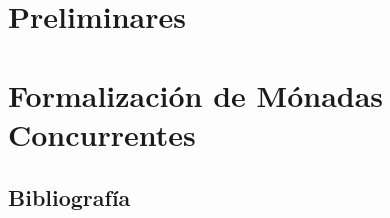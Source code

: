 \documentclass[a4paper,spanish,fixlanguage]{book}
\begin{document}




\frontmatter

\setcounter{tocdepth}{1}
\tableofcontents

\mainmatter



\part{Preliminares}\label{part:pre}





\part{Formalización de Mónadas Concurrentes}\label{part:mc}

 




\begin{appendices}

\end{appendices}

\backmatter

\chapter{Bibliograf\'{i}a}





\end{document}
